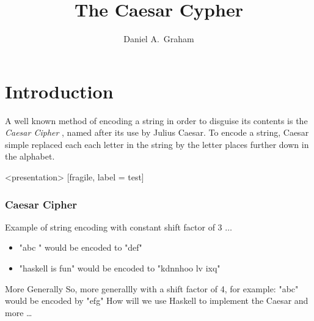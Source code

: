 \documentclass[ignorenonframetext]{beamer}
\title{The Caesar Cypher}
\author{Daniel A.\ Graham}
\begin{document}
\frame{\maketitle}

\section{Introduction}

A well known method of encoding a string in order to disguise its contents is the \textit{Caesar Cipher}
, named after its use by Julius Caesar. To encode a string, Caesar simple replaced each each letter in the string by the letter places further down in the alphabet. 
\begin{frame}<presentation> [fragile, label = test]

  \frametitle{Caesar Cipher}

Example of string encoding with constant shift factor of 3 $\dots$
    \pause
 \begin{itemize}
 \item
 "abc " would be encoded to "def"  
 \item
 "haskell is fun" would be encoded to "kdnnhoo lv ixq"

 \end{itemize}
More Generally 
So, more generallly with a shift factor of 4, for example:\hfill \break
"abc" would be encoded by "efg" \hfill \break
How will we use Haskell to implement the Caesar and more \ldots
\end{frame}
 
\end{document}
